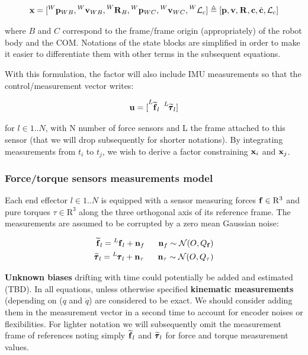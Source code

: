 \documentclass[11pt]{article}
\newcommand{\Rot}[2]{\prescript{#1}{}{\bfR}_{#2}}
\newcommand{\noise}{\bfn}
\newcommand{\posi}[2]{\prescript{#1}{}{\bfp}_{#2}}
\newcommand{\vel}[2]{\prescript{#1}{}{\bfv}_{#2}}
\newcommand{\force}[2]{\prescript{#1}{}{\bff}_{#2}}
\newcommand{\forcem}[2]{\prescript{#1}{}{\widetilde{\bff}}_{#2}}
\newcommand{\torque}[2]{\prescript{#1}{}{\pmb{\tau}}_{#2}}
\newcommand{\torquem}[2]{\prescript{#1}{}{\widetilde{\pmb{\tau}}}_{#2}}
\newcommand{\AM}{\mathcal{L}}
\newcommand{\COM}{\bfc}
\begin{document}
\begin{equation*}
\bfx = [\posi{W}{WB}, \vel{W}{WB}, \Rot{W}{B}, \posi{W}{WC}, \vel{W}{WC}, \prescript{W}{}{\AM}_{c}] 
\triangleq 
[\bfp, \bfv, \Rot{}{}, \COM, \dot{\COM}, \AM_c] 
\end{equation*}

where $B$ and $C$ correspond to the frame/frame origin (appropriately) of the robot body and the COM. Notations of the state blocks are simplified in order to make it easier to differentiate them with other terms in the subsequent equations.

With this formulation, the factor will also include IMU measurements so that the control/measurement vector writes: 

\begin{equation*}
\bfu = [\forcem{L}{l}~\torquem{L}{l}]
\end{equation*}

for $l \in 1..N$, with N number of force sensors and L the frame attached to this sensor (that we will drop subsequently for shorter notations).
By integrating measurements from $t_i$ to $t_j$, we wish to derive a factor constraining ${\bf x}_i$ and ${\bf x}_j$.

\subsubsection{Force/torque sensors measurements model}
Each end effector $l \in 1..N$ is equipped with a sensor measuring forces ${\bf f} \in \mathrm{R}^3$ and pure torques $\tau \in \mathrm{R}^3$ along the three orthogonal axis of its reference frame. The measurements are assumed to be corrupted by a zero mean Gaussian noise:

\begin{equation}
\begin{split}
    \forcem{}{l} = \force{L}{l} + \noise_f~~~~~\noise_f \sim \mathcal{N}(O,Q_{\bff})
    \\
    \torquem{}{l} = \torque{L}{l} + \noise_{\tau} ~~~~~ \noise_{\tau} \sim \mathcal{N}(O,Q_{\tau})
\end{split}
\end{equation} 

\textbf{Unknown biases} drifting with time could potentially be added and estimated (TBD). 
In all equations, unless otherwise specified \textbf{kinematic measurements} (depending on ($q$ and $\dot{q}$) are considered to be exact. We should consider adding them in the measurement vector in a second time to account for encoder noises or flexibilities.
For lighter notation we will subsequently omit the measurement frame of references noting simply \(\forcem{}{l}\) and \(\torquem{}{l}\) for force and torque measurement values.
\end{document}
